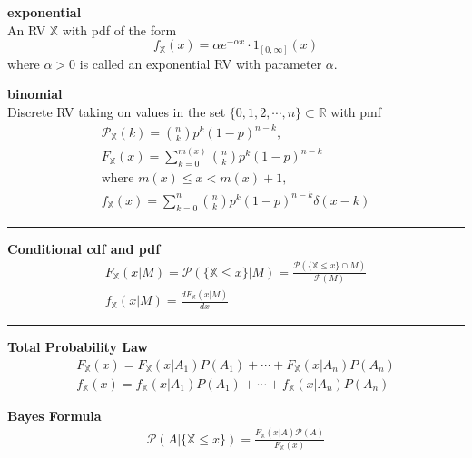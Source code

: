 \documentclass{article}
\renewcommand{\P}{\mathcal{P}}
\providecommand{\X}{\mathbb{X}}
\providecommand{\R}{\mathbb{R}}
\begin{document}
\begin{multicols*}{3}
        \textbf{exponential}\\
        An RV $\X$ with pdf of the form
        \begin{equation*}
            f_{\X}(x)=\alpha e^{-\alpha x}\cdot 1_{[0,\infty]}(x)
        \end{equation*}
        where $\alpha>0$ is called an exponential RV with parameter $\alpha$.

        \textbf{binomial}\\
        Discrete RV taking on values in the set $\{0,1,2,\cdots,n\}\subset\R$ with pmf
        \begin{equation*}
            \begin{gathered}
                \P_{\X}(k)={n\choose k}p^k(1-p)^{n-k},\\
                F_{\X}(x)= \sum_{k=0}^{m(x)} {n\choose k}p^k(1-p)^{n-k}\\
                \text{where } m(x)\leq x< m(x)+1,\\
                f_{\X}(x) = \sum_{k=0}^{n} {n\choose k}p^k(1-p)^{n-k}\delta(x-k)
            \end{gathered}
        \end{equation*}

        \noindent\rule{\columnwidth}{0.4pt}

        \textbf{Conditional cdf and pdf}
        \begin{equation*}
            \begin{gathered}
                F_{\X}(x|M)=\P(\{\X\leq x\}|M) = \frac{\P(\{\X\leq x\}\cap M)}{\P(M)}\\
                f_{\X}(x|M) = \frac{dF_\X(x|M)}{dx}
            \end{gathered}
        \end{equation*}

        \noindent\rule{\columnwidth}{0.4pt}

        \textbf{Total Probability Law}
        \begin{equation*}
            \begin{gathered}
                F_{\X}(x)=F_{\X}(x|A_1)P(A_1)+\cdots+F_{\X}(x|A_n)P(A_n)\\
                f_{\X}(x)=f_{\X}(x|A_1)P(A_1)+\cdots+f_{\X}(x|A_n)P(A_n)
            \end{gathered}
        \end{equation*}

        \textbf{Bayes Formula}
        \begin{equation*}
            \begin{gathered}
                \P(A|\{\X\leq x\}) = \frac{F_\X(x|A)\P(A)}{F_\X(x)}
            \end{gathered}
        \end{equation*}


\end{multicols*}
\end{document}
